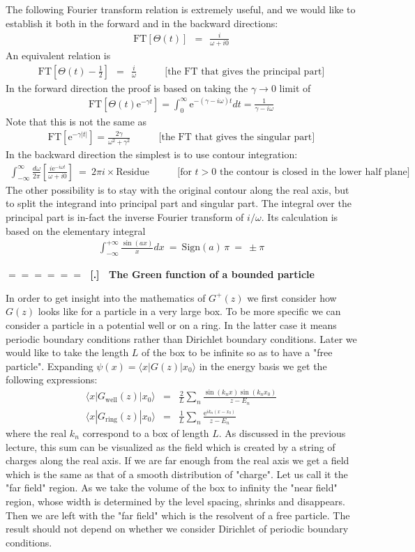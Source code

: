 \documentclass[onecolumn,fleqn]{revtex4}
\newcommand{\eexp}{\mathrm{e}^}
\newcommand{\tbox}[1]{\text{#1}}
\newcommand{\beq}{\begin{eqnarray}}
\newcommand{\eeq}{\end{eqnarray}}
\renewcommand{\thesubsection}{\arabic{subsection}}
\renewcommand{\thesubsubsection}{\arabic{subsubsection}}
\newcommand{\sheadC}[1]
{
\addtocounter{subsubsection}{1}
\vspace{5mm}
{\Large\bf $=\!=\!=\!=\!=\!=\;$ [\thesubsection.\thesubsubsection] \ #1}  
\nopagebreak
\phantomsection
}
\begin{document}
The following Fourier transform relation is extremely useful, 
and we would like to establish it both in the forward and in 
the backward directions:
\beq
\mbox{FT}\left[ \Theta(t) \right] \ \ = \ \ \frac{i}{\omega+i0} 
\eeq
An equivalent relation is  
\beq
\mbox{FT}\left[ \Theta(t)-\frac{1}{2} \right] \ \ = \ \ \frac{i}{\omega} 
\ \ \ \ \ \ \ \ \ \ \ \ \
\mbox{[the FT that gives the principal part]} 
\eeq
In the forward direction the proof is based on 
taking the $\gamma\rightarrow0$ limit of 
\beq
\mbox{FT}\left[ \Theta(t)\eexp{-\gamma t} \right]
= \int_{0}^{\infty}\eexp{-(\gamma-i\omega) t} dt 
= \frac{1}{\gamma-i\omega} 
\eeq
Note that this is not the same as 
\beq
\mbox{FT}\left[ \eexp{-\gamma |t|} \right]
= \frac{2\gamma}{\omega^2+\gamma^2} 
\ \ \ \ \ \ \ \ \ \ \ \ \
\mbox{[the FT that gives the singular part]} 
\eeq
In the backward direction the simplest is to use contour integration:
\beq
\int_{-\infty}^{\infty}\frac{d\omega}{2\pi} \left[\frac{i \eexp{-i\omega t}}{\omega+i0}\right] 
\ = \ 2\pi i \times \mbox{Residue}
\ \ \ \ \ \ \ \ \ \ \ \ \
\mbox{[for $t>0$ the contour is closed in the lower half plane]} 
\eeq
The other possibility is to stay with the original contour 
along the real axis, but to split the integrand into principal part 
and singular part. The integral over the principal part is in-fact 
the inverse Fourier transform of $i/\omega$. Its calculation is 
based on the elementary integral  
\beq
\int_{-\infty}^{+\infty} \frac{\sin(ax)}{x}dx \ = \ \mbox{Sign}(a) \, \pi  \ = \ \pm\pi
\eeq
 


 
\sheadC{The Green function of a bounded particle}


In order to get insight into the mathematics 
of $G^{+}(z)$ we first consider how $G(z)$ looks 
like for a particle in a very large box.
To be more specific we can consider a particle 
in a potential well or on a ring. In the latter case 
it means periodic boundary conditions rather 
than Dirichlet boundary conditions.  
Later we would like to take the length $L$ 
of the box to be infinite so as to have a "free particle". 
Expanding ${\psi(x)=\langle x|G(z)|x_0 \rangle}$ 
in the energy basis we get the 
following expressions:  
\beq
\langle x|G_{\tbox{well}}(z)|x_0\rangle &=& 
\frac{2}{L}\sum_n \frac{\sin(k_n x)\sin(k_n x_0)}{z-E_n} 
\\ \nonumber
\langle x|G_{\tbox{ring}}(z)|x_0\rangle &=& 
\frac{1}{L}\sum_n \frac{\eexp{ik_n(x-x_0)}}{z-E_n}
\eeq
where the real $k_n$ correspond 
to a box of length $L$. 
As discussed in the previous lecture, 
this sum can be visualized as  
the field which is created 
by a string of charges along the real axis. 
If we are far enough from the real axis 
we get a field which is the same as 
that of a smooth distribution of "charge". 
Let us call it the "far field" region.
As we take the volume of the box to infinity 
the "near field" region, whose width 
is determined by the level spacing, 
shrinks and disappears. Then we are left  
with the "far field" which is the resolvent of a free particle.
The result should not depend on whether 
we consider Dirichlet of periodic boundary conditions.  
\end{document}
